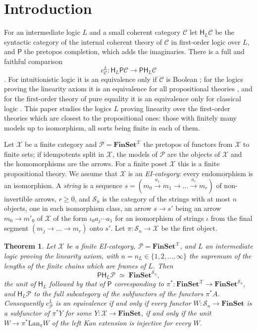 \documentclass[11pt]{amsart}
\newtheorem{thm}{Theorem}[section]
\theoremstyle{definition}
\newcommand{\Fin}{\mathbf{FinSet}}
\newcommand{\PP}{\mathsf P}
\newcommand{\HH}{\mathsf H}
\newcommand{\cX}{\mathcal X}
\newcommand{\cC}{\mathcal C}
\newcommand{\cP}{\mathcal P}
\newcommand{\cS}{\mathcal S}
\begin{document}
\section{Introduction}

For an intermediate logic $L$ and a small coherent category $\cC$ let
$\HH_L\cC$ be the syntactic category of the internal coherent theory of
$\cC$ in first-order logic over $L$, and $\PP$ the pretopos
completion, which adds the imaginaries. There is a full and faithful
comparison
\[
c^L_\cC\colon\HH_L\PP\cC\longrightarrow\PP\HH_L\cC
\]
\cite{Interm}. For intuitionistic logic it is an equivalence only if
$\cC$ is Boolean \cite{Heyting}; for the logics proving the linearity
axiom it is an equivalence for all propositional theories
\cite{Interm}, and for the first-order theory of pure equality it is an
equivalence only for classical logic \cite{Interm}. This paper studies
the logics $L$ proving linearity over the first-order theories which
are closest to the propositional ones: those with finitely many models
up to isomorphism, all sorts being finite in each of them.

Let $\cX$ be a finite category and $\cP=\Fin^{\cX}$ the pretopos of
functors from $\cX$ to finite sets; if idempotents split in $\cX$, the
models of $\cP$ are the objects of $\cX$ and the homomorphisms are the
arrows. For a finite poset $\cX$ this is a finite propositional theory.
We assume that $\cX$ is an \emph{EI-category}: every endomorphism is an
isomorphism. A \emph{string} is a sequence $s=(m_0\xrightarrow{a_1}m_1
\to\dots\xrightarrow{a_r}m_r)$ of non-invertible arrows, $r\ge0$, and
$\cS_n$ is the category of the strings with at most $n$ objects, one
in each isomorphism class, an
arrow $s\to s'$ being an arrow $m_0\to m'_0$ of $\cX$ of the form
$\iota_0a_j\cdots a_1$ for an isomorphism of strings $\iota$ from the
final segment $(m_j\to\dots\to m_r)$ onto $s'$. Let $\pi\colon\cS_n\to
\cX$ be the first object.

\begin{thm}\label{thm:main}
Let $\cX$ be a finite EI-category, $\cP=\Fin^{\cX}$, and $L$ an
intermediate logic proving the linearity axiom, with $n=n_L\in
\{1,2,\dots,\infty\}$ the supremum of the lengths of the finite chains
which are frames of $L$. Then
\[
\PP\HH_L\cP\;\simeq\;\Fin^{\cS_n},
\]
the unit of $\HH_L$ followed by that of $\PP$ corresponding to
$\pi^*\colon\Fin^{\cX}\to\Fin^{\cS_n}$, and $\HH_L\cP$ to the full
subcategory of the subfunctors of the functors $\pi^*A$. Consequently
$c^L_\cP$ is an equivalence if and only if every functor $W\colon\cS_n
\to\Fin$ is a subfunctor of $\pi^*Y$ for some $Y\colon\cX\to\Fin$, if
and only if the unit $W\to\pi^*\mathrm{Lan}_\pi W$ of the left Kan
extension is injective for every $W$.
\end{thm}
\end{document}
